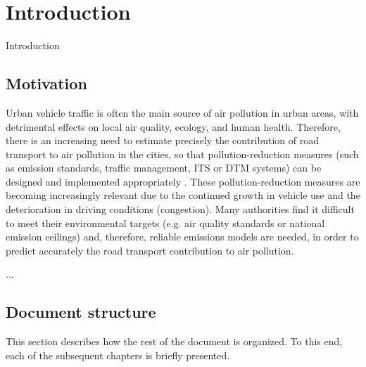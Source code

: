 \chapter{Introduction} %

Introduction


\section{Motivation}

Urban vehicle traffic is often the main source of air pollution in urban areas, with detrimental effects on local air quality, ecology, and human health. Therefore, there is an increasing need to estimate precisely the contribution of road transport to air pollution in the cities, so that pollution-reduction measures (such as emission standards, traffic management, \ac{ITS} or \ac{DTM} systems) can be designed and implemented appropriately \cite{SNB10}. These pollution-reduction measures are becoming increasingly relevant due to the continued growth in vehicle use and the deterioration in driving conditions (congestion). Many authorities find it difficult to meet their environmental targets (e.g. air quality standards or national emission ceilings) and, therefore, reliable emissions models are needed, in order to predict accurately the road transport contribution to air pollution.

...


\section{Document structure}

This section describes how the rest of the document is organized. To this end, each of the subsequent chapters is briefly presented.

